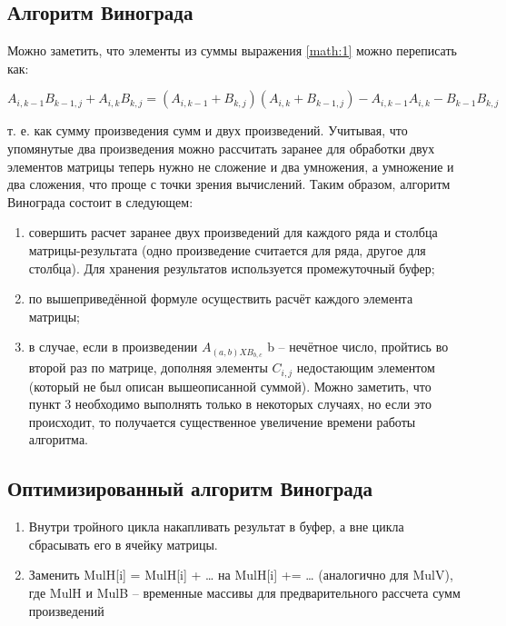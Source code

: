 \documentclass[../main.tex]{subfiles}
\begin{document}
	\subsection{Алгоритм Винограда}
	
	Можно заметить, что элементы из суммы выражения \ref{math:1} можно переписать как:
	
	\begin{equation}
	A_{i, k-1}B_{k-1,j} + A_{i,k}B_{k,j} = (A_{i,k-1} + B_{k,j})(A_{i,k} + B_{k-1,j}) - A_{i,k-1}A_{i,k} - B_{k-1}B_{k,j}
	\end{equation}
	
	т. е. как сумму произведения сумм и двух произведений. Учитывая, что упомянутые два произведения можно рассчитать заранее для обработки двух элементов матрицы теперь нужно не сложение и два умножения, а умножение и два сложения, что проще с точки зрения вычислений. Таким образом, алгоритм Винограда состоит в следующем:
	
	\begin{enumerate}
		\item совершить расчет заранее двух произведений для каждого ряда и столбца матрицы-результата (одно произведение считается для ряда, другое для столбца). Для хранения результатов используется промежуточный буфер;
		
		\item по вышеприведённой формуле осуществить расчёт каждого элемента матрицы;
		
		\item в случае, если в произведении $A_{(a,b) X B_{b,c}}$ b – нечётное число, пройтись во второй раз по матрице, дополняя элементы $C_{i,j}$ недостающим элементом (который не был описан вышеописанной суммой). Можно заметить, что пункт 3 необходимо выполнять только в некоторых случаях, но если это происходит, то получается существенное увеличение времени работы алгоритма.
	\end{enumerate} 
	
	\subsection{Оптимизированный алгоритм Винограда}
	
	\begin{enumerate}
		\item Внутри тройного цикла накапливать результат в буфер, а вне цикла сбрасывать его в ячейку матрицы.
		\item Заменить MulH[i] = MulH[i] + … на MulH[i] += … (аналогично для MulV),
		где MulH и MulB – временные массивы для предварительного рассчета сумм произведений
	\end{enumerate}
\end{document}
